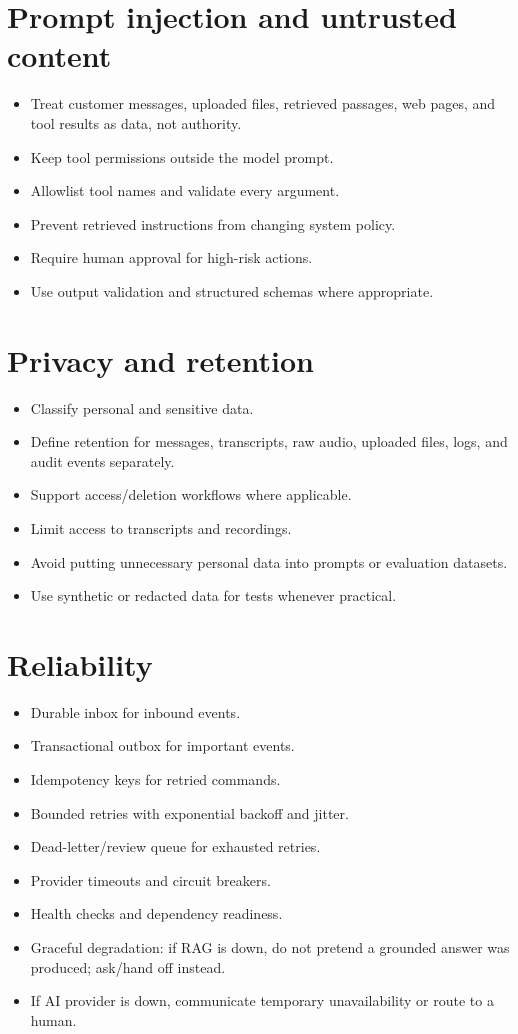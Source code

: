 \section{Prompt injection and untrusted content}

\begin{itemize}
\item Treat customer messages, uploaded files, retrieved passages, web pages, and tool results as data, not authority.
\item Keep tool permissions outside the model prompt.
\item Allowlist tool names and validate every argument.
\item Prevent retrieved instructions from changing system policy.
\item Require human approval for high-risk actions.
\item Use output validation and structured schemas where appropriate.
\end{itemize}
\section{Privacy and retention}

\begin{itemize}
\item Classify personal and sensitive data.
\item Define retention for messages, transcripts, raw audio, uploaded files, logs, and audit events separately.
\item Support access/deletion workflows where applicable.
\item Limit access to transcripts and recordings.
\item Avoid putting unnecessary personal data into prompts or evaluation datasets.
\item Use synthetic or redacted data for tests whenever practical.
\end{itemize}
\section{Reliability}

\begin{itemize}
\item Durable inbox for inbound events.
\item Transactional outbox for important events.
\item Idempotency keys for retried commands.
\item Bounded retries with exponential backoff and jitter.
\item Dead-letter/review queue for exhausted retries.
\item Provider timeouts and circuit breakers.
\item Health checks and dependency readiness.
\item Graceful degradation: if RAG is down, do not pretend a grounded answer was produced; ask/hand off instead.
\item If AI provider is down, communicate temporary unavailability or route to a human.
\end{itemize}
